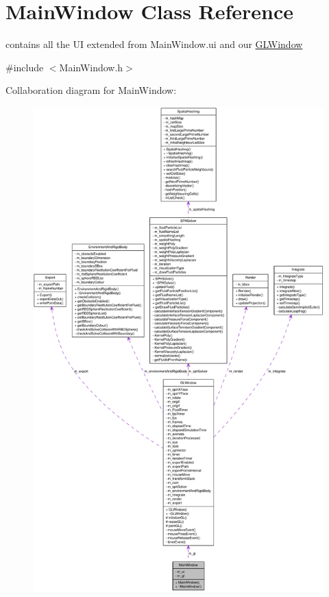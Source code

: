 \hypertarget{class_main_window}{
\section{MainWindow Class Reference}
\label{class_main_window}
}


contains all the UI extended from MainWindow.ui and our \hyperlink{class_g_l_window}{GLWindow}  




{\ttfamily \#include $<$MainWindow.h$>$}



Collaboration diagram for MainWindow:\nopagebreak
\begin{figure}[H]
\begin{center}
\leavevmode
\includegraphics[width=400pt]{class_main_window__coll__graph}
\end{center}
\end{figure}
